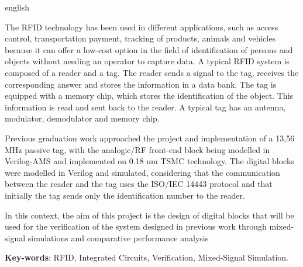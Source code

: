 \begin{resumo}[Abstract]
 \begin{otherlanguage*}{english}
   
   The RFID technology has been used in different applications, such as access control, transportation payment, tracking of products, animals and vehicles because it can offer a low-cost option in the field of identification of persons and objects without needing an operator to capture data. A typical RFID system is composed of a reader and a tag. The reader sends a signal to the tag, receives the corresponding answer and stores the information in a data bank. The tag is equipped with a memory chip, which stores the identification of the object. This information is read and sent back to the reader. A typical tag has an antenna, modulator, demodulator and memory chip.
   
      Previous graduation work approached the project and implementation of a 13,56 MHz passive tag, with the analogic/RF front-end block being modelled in Verilog-AMS and implemented on  0.18 um TSMC technology. The digital blocks were modelled in Verilog and simulated, considering that the communication between the reader and the tag uses the ISO/IEC 14443 protocol and that initially the tag sends only the identification number to the reader.
      
      In this context, the aim of this project is the design of digital blocks that will be used for the verification of the system designed in previous work through mixed-signal simulations and comparative performance analysis
   

   \vspace{\onelineskip}
 
   \noindent 
   \textbf{Key-words}: RFID, Integrated Circuits, Verification, Mixed-Signal Simulation.
 \end{otherlanguage*}
\end{resumo}
